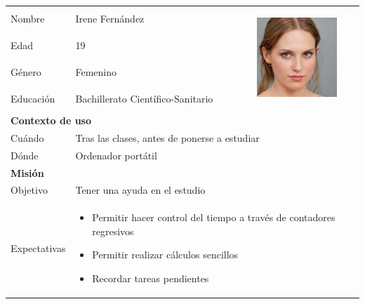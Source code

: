 \begin{table}[H]
	\centering
	\begin{tabular}{|l|l|l|} 
		\hline
		Nombre       & Irene Fernández & \multirow{4}{*}{
			\begin{minipage}[t]{0.4\textwidth}
				\begin{center}
					 \includegraphics[height=3cm]{imagenes/Persona1.jpg}
				\end{center}
			\end{minipage}
			}                 \\ [2ex]
		\cline{1-2}
		Edad         & 19 &                                   \\ [2ex] 
		\cline{1-2}
		Género         & Femenino &                                   \\ [2ex]
		\cline{1-2}
		Educación    & Bachillerato Científico-Sanitario &                                   \\ [2ex] 
		\hline
		\multicolumn{3}{|l|}{\cellcolor{lightblue}\textbf{Contexto de uso}}               \\ 
		\hline
		Cuándo       & \multicolumn{2}{l|}{Tras las clases, antes de ponerse a estudiar}                \\ 
		\hline
		Dónde        & \multicolumn{2}{l|}{Ordenador portátil}                \\ 
		\hline
		\multicolumn{3}{|l|}{\cellcolor{lightblue}\textbf{Misión}}                        \\ 
		\hline
		Objetivo     & \multicolumn{2}{l|}{Tener una ayuda en el estudio}                \\ 
		\hline
		Expectativas & \multicolumn{2}{l|}{
			\begin{minipage} [t] {0.7\textwidth}
				\begin{itemize}
					\item Permitir hacer control del tiempo a través de contadores regresivos
					\item Permitir realizar cálculos sencillos
					\item Recordar tareas pendientes
				\end{itemize}
			\end{minipage}
		}                \\ 

\end{tabular}
\end{table}
